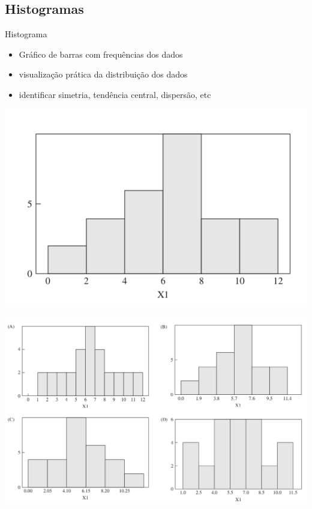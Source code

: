 \documentclass{beamer}
\begin{document}
\subsection{Histogramas}

\begin{frame}{Histograma}
  \begin{itemize}
  \item Gráfico de barras com frequências dos dados
  \item visualização prática da distribuição dos dados
  \item identificar simetria, tendência central, dispersão, etc
  \end{itemize}
\end{frame}

\begin{frame}
  \begin{center}
    \includegraphics[height=0.7\textheight]{eda-histograma1}
  \end{center}
\end{frame}

\begin{frame}
  \begin{center}
    \includegraphics[width=1\textwidth]{eda-histograma2}
  \end{center}
\end{frame}
\end{document}
